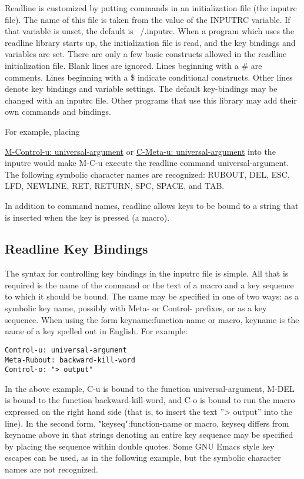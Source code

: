 Readline is customized by putting commands in an initialization file (the inputrc file). The name of this file is taken from the value of the INPUTRC variable. If that variable is unset, the default is ~/.inputrc. When a program which uses the readline library starts up, the initialization file is read, and the key bindings and variables are set. There are only a few basic constructs allowed in the readline initialization file. Blank lines are ignored. Lines beginning with a \# are comments. Lines beginning with a \$ indicate conditional constructs. Other lines denote key bindings and variable settings.
The default key-bindings may be changed with an inputrc file. Other programs that use this library may add their own commands and bindings.

For example, placing

\url{M-Control-u: universal-argument}
or
\url{C-Meta-u: universal-argument}
into the inputrc would make M-C-u execute the readline command universal-argument.
The following symbolic character names are recognized: RUBOUT, DEL, ESC, LFD, NEWLINE, RET, RETURN, SPC, SPACE, and TAB.

In addition to command names, readline allows keys to be bound to a string that is inserted when the key is pressed (a macro).

\subsection{Readline Key Bindings}\label{sec:readlinekeybindings}

The syntax for controlling key bindings in the inputrc file is simple. All that is required is the name of the command or the text of a macro and a key sequence to which it should be bound. The name may be specified in one of two ways: as a symbolic key name, possibly with Meta- or Control- prefixes, or as a key sequence.
When using the form keyname:function-name or macro, keyname is the name of a key spelled out in English. For example:

\begin{lstlisting}
Control-u: universal-argument
Meta-Rubout: backward-kill-word
Control-o: "> output"
\end{lstlisting}

In the above example, C-u is bound to the function universal-argument, M-DEL is bound to the function backward-kill-word, and C-o is bound to run the macro expressed on the right hand side (that is, to insert the text ''> output'' into the line).
In the second form, "keyseq":function-name or macro, keyseq differs from keyname above in that strings denoting an entire key sequence may be specified by placing the sequence within double quotes. Some GNU Emacs style key escapes can be used, as in the following example, but the symbolic character names are not recognized.

